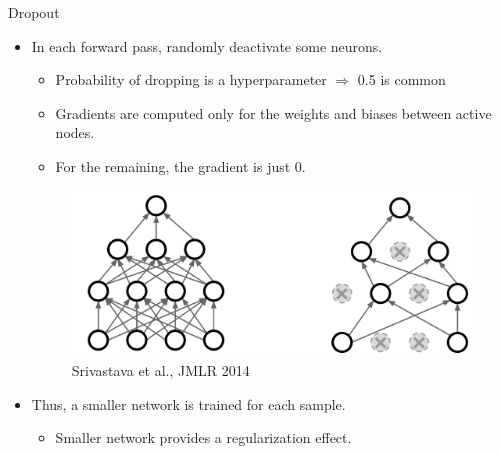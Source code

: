 \documentclass[serif, aspectratio=169]{beamer}
\begin{document}
\begin{frame}{Dropout}
	\begin{itemize}
		\item In each forward pass, randomly deactivate some neurons.
		\begin{itemize}
			\item Probability of dropping is a hyperparameter $\Rightarrow$ 0.5 is common
			\item Gradients are computed only for the weights and biases between active nodes.
			\item For the remaining, the gradient is just 0.
		\end{itemize}
		\begin{figure}[htpb]
			\begin{center}
				\includegraphics[keepaspectratio, scale=0.15]{pic/dropout}
				\caption*{\scriptsize Srivastava et al., JMLR 2014}
			\end{center}
		\end{figure}
		\vspace{-1em}
		\item Thus, a smaller network is trained for each sample.
		\begin{itemize}
			\item Smaller network provides a regularization effect.
		\end{itemize}
	\end{itemize}
\end{frame}
\end{document}
